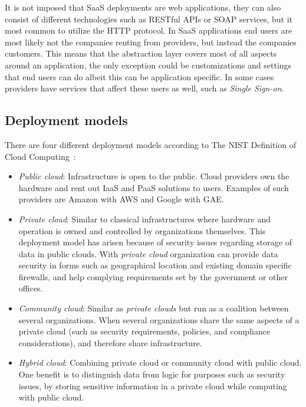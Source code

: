 It is not imposed that SaaS deployments are web applications, they can also consist of
different technologies such as RESTful APIs or SOAP services, but it most common to utilize the HTTP protocol.
In SaaS applications end users are most likely not the companies renting from providers, 
but instead the companies customers.
This means that the abstraction layer covers most of all aspects around an application,
the only exception could be customizations and settings that end users can do albeit 
this can be application specific. In some cases providers have services that affect
these users as well, such as \emph{Single Sign-on}.

\subsection{Deployment models}

There are four different deployment models according to The 
NIST Definition of Cloud Computing~\cite{nist:mell11}:
\begin{itemize}
  \item \emph{Public cloud}: Infrastructure is open to the public.
    Cloud providers own the hardware and rent out IaaS and PaaS solutions to users.
    Examples of such providers are Amazon with AWS and Google with GAE.
  \item \emph{Private cloud}: Similar to classical infrastructures where hardware and
    operation is owned and controlled by organizations themselves.
    This deployment model has arisen because of security issues regarding storage 
    of data in public clouds. With \emph{private cloud} organization can provide 
    data security in forms such as geographical location and existing domain specific firewalls,
    and help complying requirements set by the government or other offices.
  \item \emph{Community cloud}: Similar as \emph{private clouds} but run as a
    coalition between several organizations.
    When several organizations share the same aspects of
    a private cloud (such as security requirements, policies, and compliance considerations),
    and therefore share infrastructure. 
  \item \emph{Hybrid cloud}: Combining private cloud or community cloud with public cloud.
    One benefit is to distinguish data from logic for purposes such as security issues,
    by storing sensitive information in a private cloud while computing with public cloud.
\end{itemize}


